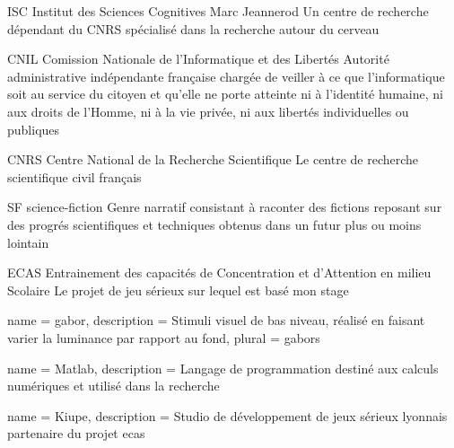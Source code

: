   {ISC}
  {Institut des Sciences Cognitives Marc Jeannerod}
  {Un centre de recherche dépendant du \gls{CNRS} spécialisé dans la recherche autour du cerveau}

  {CNIL}
  {Comission Nationale de l'Informatique et des Libertés}
  {Autorité administrative indépendante française chargée de veiller à ce que l’informatique soit au service du citoyen et qu’elle ne porte atteinte ni à l’identité humaine, ni aux droits de l’Homme, ni à la vie privée, ni aux libertés individuelles ou publiques}

  {CNRS}
  {Centre National de la Recherche Scientifique}
  {Le centre de recherche scientifique civil français}

  {SF}
  {science-fiction}
  {Genre narratif consistant à raconter des fictions reposant sur des progrés scientifiques et techniques obtenus dans un futur plus ou moins lointain}

  {ECAS}
  {Entrainement des capacités de Concentration et d'Attention en milieu Scolaire}
  {Le projet de jeu sérieux sur lequel est basé mon stage} 

 {
  name = gabor,
  description = {Stimuli visuel de bas niveau, réalisé en faisant varier la luminance par rapport au fond},
  plural = gabors
}


 {
  name = Matlab,
  description = {Langage de programmation destiné aux calculs numériques et utilisé dans la recherche}
}

 {
  name = Kiupe,
  description = {Studio de développement de jeux sérieux lyonnais partenaire du projet \gls{ecas}}
}